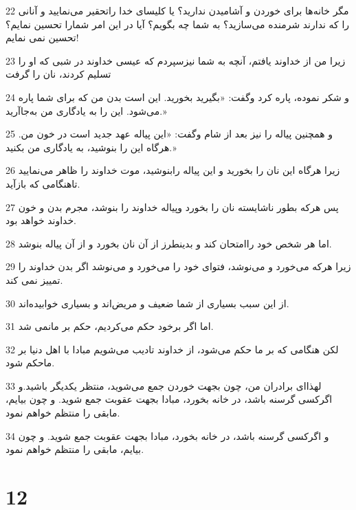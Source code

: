 \par 22 مگر خانه‌ها برای خوردن و آشامیدن ندارید؟ یا کلیسای خدا راتحقیر می‌نمایید و آنانی را که ندارند شرمنده می‌سازید؟ به شما چه بگویم؟ آیا در این امر شمارا تحسین نمایم؟ تحسین نمی نمایم!
\par 23 زیرا من از خداوند یافتم، آنچه به شما نیزسپردم که عیسی خداوند در شبی که او را تسلیم کردند، نان را گرفت
\par 24 و شکر نموده، پاره کرد وگفت: «بگیرید بخورید. این است بدن من که برای شما پاره می‌شود. این را به یادگاری من به‌جاآرید.»
\par 25 و همچنین پیاله را نیز بعد از شام وگفت: «این پیاله عهد جدید است در خون من. هرگاه این را بنوشید، به یادگاری من بکنید.»
\par 26 زیرا هرگاه این نان را بخورید و این پیاله رابنوشید، موت خداوند را ظاهر می‌نمایید تاهنگامی که بازآید.
\par 27 پس هرکه بطور ناشایسته نان را بخورد وپیاله خداوند را بنوشد، مجرم بدن و خون خداوند خواهد بود.
\par 28 اما هر شخص خود راامتحان کند و بدینطرز از آن نان بخورد و از آن پیاله بنوشد.
\par 29 زیرا هرکه می‌خورد و می‌نوشد، فتوای خود را می‌خورد و می‌نوشد اگر بدن خداوند را تمییز نمی کند.
\par 30 از این سبب بسیاری از شما ضعیف و مریض‌اند و بسیاری خوابیده‌اند.
\par 31 اما اگر برخود حکم می‌کردیم، حکم بر مانمی شد.
\par 32 لکن هنگامی که بر ما حکم می‌شود، از خداوند تادیب می‌شویم مبادا با اهل دنیا بر ماحکم شود.
\par 33 لهذا‌ای برادران من، چون بجهت خوردن جمع می‌شوید، منتظر یکدیگر باشید.و اگرکسی گرسنه باشد، در خانه بخورد، مبادا بجهت عقوبت جمع شوید. و چون بیایم، مابقی را منتظم خواهم نمود.
\par 34 و اگرکسی گرسنه باشد، در خانه بخورد، مبادا بجهت عقوبت جمع شوید. و چون بیایم، مابقی را منتظم خواهم نمود.

\chapter{12}

